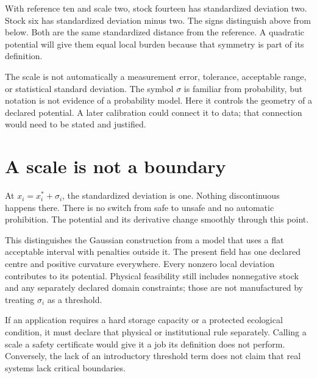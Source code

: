 With reference ten and scale two, stock fourteen has standardized deviation two. Stock six has standardized deviation minus two. The signs distinguish above from below. Both are the same standardized distance from the reference. A quadratic potential will give them equal local burden because that symmetry is part of its definition.

The scale is not automatically a measurement error, tolerance, acceptable range, or statistical standard deviation. The symbol \(\sigma\) is familiar from probability, but notation is not evidence of a probability model. Here it controls the geometry of a declared potential. A later calibration could connect it to data; that connection would need to be stated and justified.

\section{A scale is not a boundary}
At \(x_i=x_i^*+\sigma_i\), the standardized deviation is one. Nothing discontinuous happens there. There is no switch from safe to unsafe and no automatic prohibition. The potential and its derivative change smoothly through this point.

This distinguishes the Gaussian construction from a model that uses a flat acceptable interval with penalties outside it. The present field has one declared centre and positive curvature everywhere. Every nonzero local deviation contributes to its potential. Physical feasibility still includes nonnegative stock and any separately declared domain constraints; those are not manufactured by treating \(\sigma_i\) as a threshold.

If an application requires a hard storage capacity or a protected ecological condition, it must declare that physical or institutional rule separately. Calling a scale a safety certificate would give it a job its definition does not perform. Conversely, the lack of an introductory threshold term does not claim that real systems lack critical boundaries.

